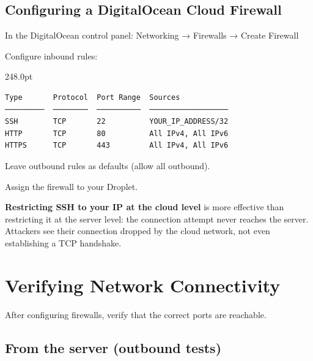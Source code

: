 \subsection*{Configuring a DigitalOcean Cloud Firewall}\label{22-network-configuration:configuring-a-digitalocean-cloud-firewall}

In the DigitalOcean control panel: Networking → Firewalls → Create Firewall

Configure inbound rules:

\begin{diagrambox}[short]{248.0pt}
\begin{Verbatim}[fontsize=\fontsize{9.0}{8.55}\selectfont]
Type       Protocol  Port Range  Sources
─────────  ────────  ──────────  ──────────────────
SSH        TCP       22          YOUR_IP_ADDRESS/32
HTTP       TCP       80          All IPv4, All IPv6
HTTPS      TCP       443         All IPv4, All IPv6
\end{Verbatim}
\end{diagrambox}

\noindent{}Leave outbound rules as defaults (allow all outbound).

Assign the firewall to your Droplet.

\textbf{Restricting SSH to your IP at the cloud level} is more effective than restricting it at the server level: the connection attempt never reaches the server. Attackers see their connection dropped by the cloud network, not even establishing a TCP handshake.

\setcounter{section}{4}
\section{Verifying Network Connectivity}\label{22-network-configuration:225-verifying-network-connectivity}

After configuring firewalls, verify that the correct ports are reachable.

\subsection*{From the server (outbound tests)}\label{22-network-configuration:from-the-server-outbound-tests}

